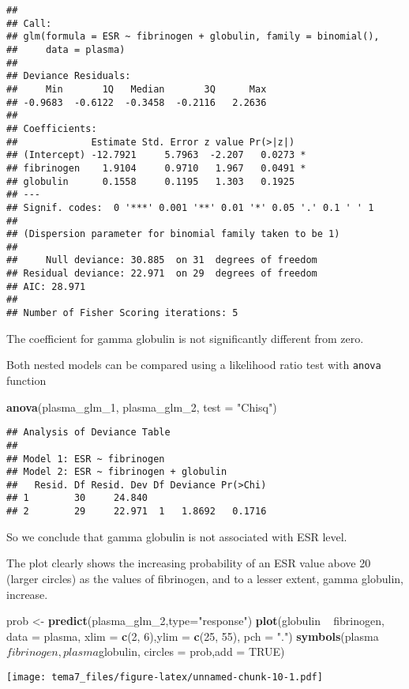 \documentclass[]{article}
\newenvironment{Shaded}{\begin{snugshade}}{\end{snugshade}}
\newcommand{\KeywordTok}[1]{\textcolor[rgb]{0.13,0.29,0.53}{\textbf{{#1}}}}
\newcommand{\DataTypeTok}[1]{\textcolor[rgb]{0.13,0.29,0.53}{{#1}}}
\newcommand{\DecValTok}[1]{\textcolor[rgb]{0.00,0.00,0.81}{{#1}}}
\newcommand{\StringTok}[1]{\textcolor[rgb]{0.31,0.60,0.02}{{#1}}}
\newcommand{\OtherTok}[1]{\textcolor[rgb]{0.56,0.35,0.01}{{#1}}}
\newcommand{\NormalTok}[1]{{#1}}
\numberwithin{equation}{section}
\begin{document}
\begin{verbatim}
## 
## Call:
## glm(formula = ESR ~ fibrinogen + globulin, family = binomial(), 
##     data = plasma)
## 
## Deviance Residuals: 
##     Min       1Q   Median       3Q      Max  
## -0.9683  -0.6122  -0.3458  -0.2116   2.2636  
## 
## Coefficients:
##             Estimate Std. Error z value Pr(>|z|)  
## (Intercept) -12.7921     5.7963  -2.207   0.0273 *
## fibrinogen    1.9104     0.9710   1.967   0.0491 *
## globulin      0.1558     0.1195   1.303   0.1925  
## ---
## Signif. codes:  0 '***' 0.001 '**' 0.01 '*' 0.05 '.' 0.1 ' ' 1
## 
## (Dispersion parameter for binomial family taken to be 1)
## 
##     Null deviance: 30.885  on 31  degrees of freedom
## Residual deviance: 22.971  on 29  degrees of freedom
## AIC: 28.971
## 
## Number of Fisher Scoring iterations: 5
\end{verbatim}

The coefficient for gamma globulin is not significantly different from
zero.

Both nested models can be compared using a likelihood ratio test with
\texttt{anova} function

\begin{Shaded}
\begin{Highlighting}[]
\KeywordTok{anova}\NormalTok{(plasma_glm_1, plasma_glm_2, }\DataTypeTok{test =} \StringTok{"Chisq"}\NormalTok{)}
\end{Highlighting}
\end{Shaded}

\begin{verbatim}
## Analysis of Deviance Table
## 
## Model 1: ESR ~ fibrinogen
## Model 2: ESR ~ fibrinogen + globulin
##   Resid. Df Resid. Dev Df Deviance Pr(>Chi)
## 1        30     24.840                     
## 2        29     22.971  1   1.8692   0.1716
\end{verbatim}

So we conclude that gamma globulin is not associated with ESR level.

The plot clearly shows the increasing probability of an ESR value above
20 (larger circles) as the values of fibrinogen, and to a lesser extent,
gamma globulin, increase.

\begin{Shaded}
\begin{Highlighting}[]
\NormalTok{prob <-}\StringTok{ }\KeywordTok{predict}\NormalTok{(plasma_glm_2,}\DataTypeTok{type=}\StringTok{"response"}\NormalTok{)}
\KeywordTok{plot}\NormalTok{(globulin ~}\StringTok{ }\NormalTok{fibrinogen, }\DataTypeTok{data =} \NormalTok{plasma, }\DataTypeTok{xlim =} \KeywordTok{c}\NormalTok{(}\DecValTok{2}\NormalTok{, }\DecValTok{6}\NormalTok{),}\DataTypeTok{ylim =} \KeywordTok{c}\NormalTok{(}\DecValTok{25}\NormalTok{, }\DecValTok{55}\NormalTok{), }\DataTypeTok{pch =} \StringTok{"."}\NormalTok{)}
\KeywordTok{symbols}\NormalTok{(plasma$fibrinogen, plasma$globulin, }\DataTypeTok{circles =} \NormalTok{prob,}\DataTypeTok{add =} \OtherTok{TRUE}\NormalTok{)}
\end{Highlighting}
\end{Shaded}

\texttt{[image: tema7\_files/figure-latex/unnamed-chunk-10-1.pdf]}
\end{document}
